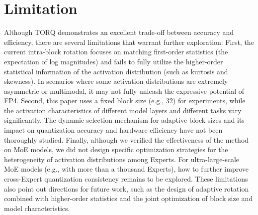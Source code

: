 \section{Limitation}
Although TORQ demonstrates an excellent trade-off between accuracy and efficiency, there are several limitations that warrant further exploration: First, the current intra-block rotation focuses on matching first-order statistics (the expectation of log magnitudes) and fails to fully utilize the higher-order statistical information of the activation distribution (such as kurtosis and skewness). In scenarios where some activation distributions are extremely asymmetric or multimodal, it may not fully unleash the expressive potential of FP4. Second, this paper uses a fixed block size (e.g., 32) for experiments, while the activation characteristics of different model layers and different tasks vary significantly. The dynamic selection mechanism for adaptive block sizes and its impact on quantization accuracy and hardware efficiency have not been thoroughly studied. Finally, although we verified the effectiveness of the method on MoE models, we did not design specific optimization strategies for the heterogeneity of activation distributions among Experts. For ultra-large-scale MoE models (e.g., with more than a thousand Experts), how to further improve cross-Expert quantization consistency remains to be explored. These limitations also point out directions for future work, such as the design of adaptive rotation combined with higher-order statistics and the joint optimization of block size and model characteristics.

